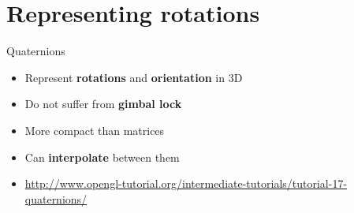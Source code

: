 \part{Representing rotations}
\frame{\partpage}

\begin{frame}{Quaternions}
	\begin{itemize}
		\pause\item Represent \textbf{rotations} and \textbf{orientation} in 3D
		\pause\item Do not suffer from \textbf{gimbal lock}
		\pause\item More compact than matrices
		\pause\item Can \textbf{interpolate} between them
		\pause\item \url{http://www.opengl-tutorial.org/intermediate-tutorials/tutorial-17-quaternions/}
	\end{itemize}
\end{frame}
